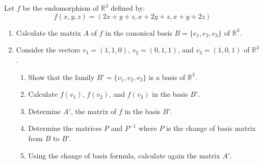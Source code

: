 \documentclass[12pt]{article}
\begin{document}
\newpage  
\section{}
Let $f$ be the endomorphism of $\mathbb{R}^3$ defined by:
\[
f(x,y,z) = (2x+y+z, x+2y+z, x+y+2z)
\]

\begin{enumerate}
    \item Calculate the matrix $A$ of $f$ in the canonical basis $B = \{e_1, e_2, e_3\}$ of $\mathbb{R}^3$.
    
    \item Consider the vectors $v_1 = (1,1,0)$, $v_2 = (0,1,1)$, and $v_3 = (1,0,1)$ of $\mathbb{R}^3$.
    \begin{enumerate}
        \item Show that the family $B' = \{v_1, v_2, v_3\}$ is a basis of $\mathbb{R}^3$.
        \item Calculate $f(v_1)$, $f(v_2)$, and $f(v_3)$ in the basis $B'$.
        \item Determine $A'$, the matrix of $f$ in the basis $B'$.
        \item Determine the matrices $P$ and $P^{-1}$ where $P$ is the change of basis matrix from $B$ to $B'$.
        \item Using the change of basis formula, calculate again the matrix $A'$.
    \end{enumerate}
\end{enumerate}


\begin{answerbox}
\end{answerbox}

\end{document}
